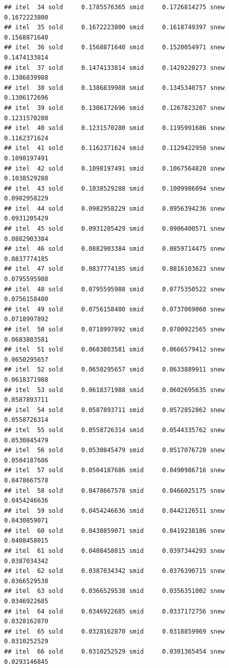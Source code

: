 \documentclass[
  12pt,
]{article}
\begin{document}
\begin{verbatim}
## itel  34 sold     0.1785576365 smid     0.1726814275 snew     0.1672223800 
## itel  35 sold     0.1672223800 smid     0.1618749397 snew     0.1568871640 
## itel  36 sold     0.1568871640 smid     0.1520054971 snew     0.1474133814 
## itel  37 sold     0.1474133814 smid     0.1429220273 snew     0.1386839988 
## itel  38 sold     0.1386839988 smid     0.1345340757 snew     0.1306172696 
## itel  39 sold     0.1306172696 smid     0.1267823207 snew     0.1231570280 
## itel  40 sold     0.1231570280 smid     0.1195991686 snew     0.1162371624 
## itel  41 sold     0.1162371624 smid     0.1129422950 snew     0.1098197491 
## itel  42 sold     0.1098197491 smid     0.1067564820 snew     0.1038529288 
## itel  43 sold     0.1038529288 smid     0.1009986094 snew     0.0982958229 
## itel  44 sold     0.0982958229 smid     0.0956394236 snew     0.0931205429 
## itel  45 sold     0.0931205429 smid     0.0906400571 snew     0.0882903384 
## itel  46 sold     0.0882903384 smid     0.0859714475 snew     0.0837774185 
## itel  47 sold     0.0837774185 smid     0.0816103623 snew     0.0795595988 
## itel  48 sold     0.0795595988 smid     0.0775350522 snew     0.0756158480 
## itel  49 sold     0.0756158480 smid     0.0737069060 snew     0.0718997892 
## itel  50 sold     0.0718997892 smid     0.0700922565 snew     0.0683803581 
## itel  51 sold     0.0683803581 smid     0.0666579412 snew     0.0650295657 
## itel  52 sold     0.0650295657 smid     0.0633889911 snew     0.0618371988 
## itel  53 sold     0.0618371988 smid     0.0602695635 snew     0.0587893711 
## itel  54 sold     0.0587893711 smid     0.0572852862 snew     0.0558726314 
## itel  55 sold     0.0558726314 smid     0.0544335762 snew     0.0530845479 
## itel  56 sold     0.0530845479 smid     0.0517076720 snew     0.0504187686 
## itel  57 sold     0.0504187686 smid     0.0490986716 snew     0.0478667578 
## itel  58 sold     0.0478667578 smid     0.0466025175 snew     0.0454246636 
## itel  59 sold     0.0454246636 smid     0.0442126511 snew     0.0430859071 
## itel  60 sold     0.0430859071 smid     0.0419238186 snew     0.0408458015 
## itel  61 sold     0.0408458015 smid     0.0397344293 snew     0.0387034342 
## itel  62 sold     0.0387034342 smid     0.0376390715 snew     0.0366529538 
## itel  63 sold     0.0366529538 smid     0.0356351002 snew     0.0346922685 
## itel  64 sold     0.0346922685 smid     0.0337172756 snew     0.0328162870 
## itel  65 sold     0.0328162870 smid     0.0318859969 snew     0.0310252529 
## itel  66 sold     0.0310252529 smid     0.0301365454 snew     0.0293146845 

\end{verbatim}
\end{document}
